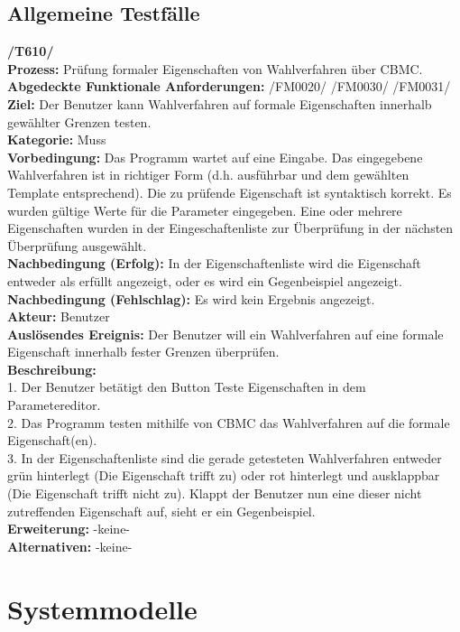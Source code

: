 \documentclass[a4paper]{scrreprt}
\begin{document}
\section{Allgemeine Testfälle}
\textbf{/T610/} \\
\textbf{Prozess: }Prüfung formaler Eigenschaften von Wahlverfahren über CBMC.\\
\textbf{Abgedeckte Funktionale Anforderungen:} /FM0020/ /FM0030/ /FM0031/ \\
\textbf{Ziel:} Der Benutzer kann Wahlverfahren auf formale Eigenschaften innerhalb gewählter Grenzen testen.\\
\textbf{Kategorie:} Muss\\
\textbf{Vorbedingung:} Das Programm wartet auf eine Eingabe. Das eingegebene Wahlverfahren ist in richtiger Form (d.h. ausführbar und dem gewählten Template entsprechend). Die zu prüfende Eigenschaft ist syntaktisch korrekt. Es wurden gültige Werte für die Parameter eingegeben. Eine oder mehrere Eigenschaften wurden in der Eingeschaftenliste zur Überprüfung in der nächsten Überprüfung ausgewählt. \\
\textbf{Nachbedingung (Erfolg):} In der Eigenschaftenliste wird die Eigenschaft entweder als erfüllt angezeigt, oder es wird ein Gegenbeispiel angezeigt.\\
\textbf{Nachbedingung (Fehlschlag):} Es wird kein Ergebnis angezeigt.\\
\textbf{Akteur:} Benutzer\\
\textbf{Auslösendes Ereignis:} Der Benutzer will ein Wahlverfahren auf eine formale Eigenschaft innerhalb fester Grenzen überprüfen.\\
\textbf{Beschreibung:} \\
1. Der Benutzer betätigt den Button Teste Eigenschaften in dem Parametereditor. \\
2. Das Programm testen mithilfe von CBMC das Wahlverfahren auf die formale Eigenschaft(en). \\
3. In der Eigenschaftenliste sind die gerade getesteten Wahlverfahren entweder grün hinterlegt (Die Eigenschaft trifft zu) oder rot hinterlegt und ausklappbar (Die Eigenschaft trifft nicht zu). Klappt der Benutzer nun eine dieser nicht zutreffenden Eigenschaft auf, sieht er ein Gegenbeispiel. \\
\textbf {Erweiterung:} -keine- \\
\textbf {Alternativen:} -keine- \\

\chapter{Systemmodelle}
\end{document}
